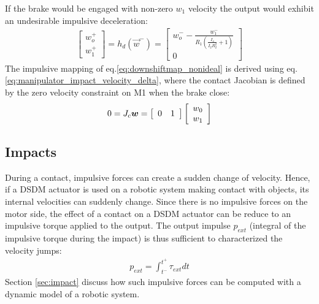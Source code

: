 %
If the brake would be engaged with non-zero $w_1$ velocity the output would exhibit an undesirable impulsive deceleration:
\begin{align} 
\left[
\begin{array}{c}
w_o^+ \\ w_1^+
\end{array}
\right]
 = h_d( \vec{w}^- ) = 
\left[
\begin{array}{c}
w_o^- - \frac{w_1^-}{ R_1 \left( \frac{I_o}{I_2 R_2^2} + 1 \right) } \\ 0
\end{array}
\right]
\label{eq:downshiftmap_nonideal}
\end{align}
%
The impulsive mapping of eq.\eqref{eq:downshiftmap_nonideal} is derived using eq.\eqref{eq:manipulator_impact_velocity_delta}, where the contact Jacobian is defined by the zero velocity constraint on M1 when the brake close:
\begin{align} 
0 = J_c \vec{w} = 
\left[
\begin{array}{c c}
0 & 1
\end{array}
\right] 
\left[
\begin{array}{c}
w_0 \\ w_1 
\end{array}
\right]
\label{eq:downshiftmap_nonideal_jacobian}
\end{align}





\subsection{Impacts}
\label{sec:model_impact}

During a contact, impulsive forces can create a sudden change of velocity. Hence, if a DSDM actuator is used on a robotic system making contact with objects, its internal velocities can suddenly change. Since there is no impulsive forces on the motor side, the effect of a contact on a DSDM actuator can be reduce to an impulsive torque applied to the output. The output impulse $p_{ext}$ (integral of the impulsive torque during the impact) is thus sufficient to characterized the velocity jumps:
%
\begin{align}
p_{ext} = \int_{t^-}^{t^+} \tau_{ext} dt
\label{eq:outputimpulsedefine}
\end{align}
%
Section \ref{sec:impact} discuss how such impulsive forces can be computed with a dynamic model of a robotic system.


